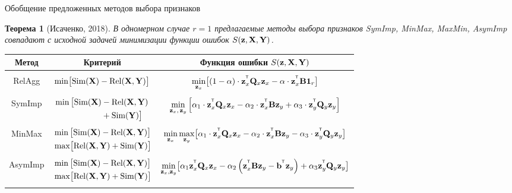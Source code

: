 \documentclass[10pt]{beamer}
\newtheorem{rustheorem}{Теорема}
\begin{document}
\begin{frame}{Обобщение предложенных методов выбора признаков}
	\begin{rustheorem}[Исаченко, 2018]
		В одномерном случае $r=1$ предлагаемые методы выбора признаков SymImp, MinMax, MaxMin, AsymImp совпадают с исходной задачей минимизации функции ошибок $S(\bz, \bX, \bY)$.
	\end{rustheorem}
	\begin{table}
		\centering
		\footnotesize{
			\begin{tabular}{c|c|c}
				\hline
				Метод & Критерий & Функция ошибки $S(\bz, \bX, \bY)$ \\
				\hline && \\ 
				RelAgg & $\min \bigl[ \text{Sim}(\bX) - \text{Rel}(\bX, \bY) \bigr] $ & $\min\limits_{\bz_x} \bigl[ (1 - \alpha) \cdot \bz_x^{\T} \bQ_x \bz_x - \alpha \cdot \bz_x^{\T} \bB \bOne_r \bigr] $ \\ &&\\
				SymImp & $\begin{aligned} \min \, \bigl[ \text{Sim}(\bX) & - \text{Rel}(\bX, \bY) \\ & + \text{Sim}(\bY) \bigr] \end{aligned}$ & $ \min\limits_{\bz_x, \, \bz_y} \left[ \alpha_1 \cdot \bz_x^{\T} \bQ_x \bz_x - \alpha_2 \cdot \bz_x^{\T} \bB \bz_y + \alpha_3 \cdot \bz_y^{\T} \bQ_y \bz_y \right] $\\ &&\\ 
				MinMax & $\begin{aligned} &\min \, \bigl[ \text{Sim}(\bX) - \text{Rel}(\bX, \bY) \bigr]  \\ & \max \bigl[\text{Rel}(\bX, \bY) + \text{Sim}(\bY) \bigr] \end{aligned}$ & $	\min\limits_{\bz_x} 	\max\limits_{\bz_y} \bigl[\alpha_1 \cdot \bz_x^{\T} \bQ_x \bz_x - \alpha_2 \cdot \bz_x^{\T} \bB \bz_y - \alpha_3 \cdot \bz_y^{\T} \bQ_y \bz_y \bigr]$ \\ &&\\ 
				AsymImp & $\begin{aligned} & \min \, \bigl[ \text{Sim}(\bX) - \text{Rel}(\bX, \bY) \bigr]\\ &  \max \bigl[\text{Rel}(\bX, \bY) + \text{Sim}(\bY) \bigr] \end{aligned}$ & $\min\limits_{\bz_x, \bz_y} \bigl[ \alpha_1 \bz_x^{\T} \bQ_x \bz_x - \alpha_2 \left(\bz_x^{\T} \bB \bz_y - \bb^{\T} \bz_y \right) + \alpha_3  \bz_y^{\T} \bQ_y \bz_y \bigr]$\\  && \\
				\hline
		\end{tabular}}
	\end{table}
\end{frame}
\end{document}

